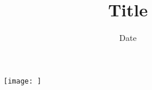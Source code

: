 \documentclass{article}
\begin{document}
\title{Title}

\date{Date}
\maketitle
\begin{figure}
    \centering
    \texttt{[image: ]}
    \label{fig:my_label}
\end{figure}
\pagebreak[4]




\pagebreak[4]

\setcounter{tocdepth}{2}
\tableofcontents

\pagebreak[4]

\pagebreak[4]

\pagebreak[4]

\pagebreak[4]

\pagebreak[4]

\pagebreak[4]

\end{document}
